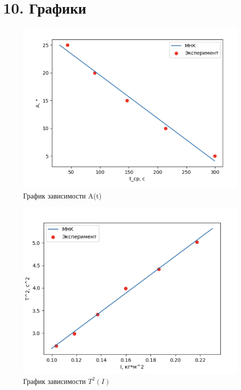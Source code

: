 \documentclass[14pt]{extreport}
\begin{document}
\newpage


\section*{10. Графики}

\begin{figure}[H]
	\begin{center}
		\includegraphics[scale=0.8]{A_t.png}
		\caption{График зависимости A(t)}
		\label{pic}
	\end{center}
\end{figure}

\begin{figure}[H]
	\begin{center}
		\includegraphics[scale=0.9]{T_I.png}
		\caption{График зависимости $T^2(I)$}
		\label{pic}
	\end{center}
\end{figure}
\end{document}
